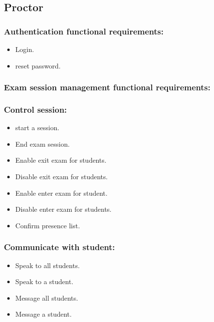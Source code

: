 \documentclass[]{uc2pfecaneva}
\begin{document}
    \subsection{Proctor}
    \begin{itemize}
        \subsubsection{Authentication functional requirements:}
        \begin{itemize}
            \item Login.
            \item reset password.
        \end{itemize}

        \subsubsection{Exam session management functional requirements:}
        \begin{itemize}
            \subsubsection{Control session:}
            \begin{itemize}
                \item start a session.
                \item End exam session.
                \item Enable exit exam for students.
                \item Disable exit exam for students.
                \item Enable enter exam for student.
                \item Disable enter exam for students.
                \item Confirm presence list.
            \end{itemize}
            \subsubsection{Communicate with student:}
            \begin{itemize}
                \item Speak to all students.
                \item Speak to a student.
                \item Message all students.
                \item Message a student.
            \end{itemize}

\end{itemize}
\end{itemize}
\end{document}
